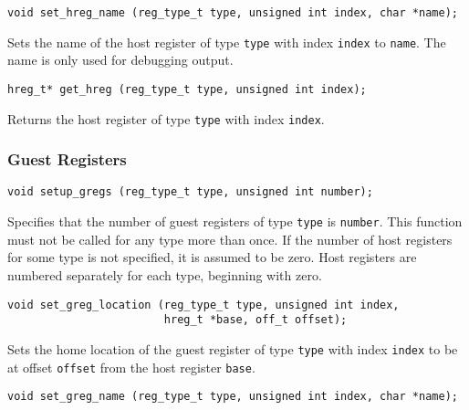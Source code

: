\documentclass{article}
\newcommand{\cc}[1]{\texttt{#1}} %
\begin{document}
\begin{verbatim}
void set_hreg_name (reg_type_t type, unsigned int index, char *name);
\end{verbatim}

Sets the name of the host register of type \cc{type} with index
\cc{index} to \cc{name}.  The name is only used for debugging output.

\begin{verbatim}
hreg_t* get_hreg (reg_type_t type, unsigned int index);
\end{verbatim}

Returns the host register of type \cc{type} with index \cc{index}.

\subsubsection{Guest Registers}

\begin{verbatim}
void setup_gregs (reg_type_t type, unsigned int number);
\end{verbatim}

Specifies that the number of guest registers of type \cc{type} is
\cc{number}.  This function must not be called for any type more than
once.
If the number of host registers for some type is not specified, it is
assumed to be zero.  Host registers are numbered separately for each
type, beginning with zero.

\begin{verbatim}
void set_greg_location (reg_type_t type, unsigned int index,
                        hreg_t *base, off_t offset);
\end{verbatim}

Sets the home location of the guest register of type \cc{type} with
index \cc{index} to be at offset \cc{offset} from the host register
\cc{base}.

\begin{verbatim}
void set_greg_name (reg_type_t type, unsigned int index, char *name);
\end{verbatim}
\end{document}
